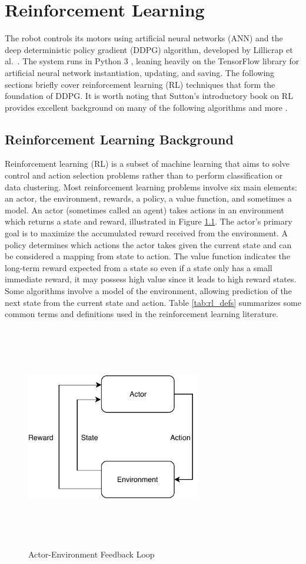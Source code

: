\chapter{Reinforcement Learning}
The robot controls its motors using artificial neural networks (ANN) and the deep deterministic policy gradient (DDPG) algorithm, developed by Lillicrap et al.\ \cite{lillicrap_2016}. The system runs in Python 3 \cite{python3}, leaning heavily on the TensorFlow library \cite{tensorflow} for artificial neural network instantiation, updating, and saving. The following sections briefly cover reinforcement learning (RL) techniques that form the foundation of DDPG. It is worth noting that Sutton's introductory book on RL provides excellent background on many of the following algorithms and more \cite{sutton_2017}.

\section{Reinforcement Learning Background}
Reinforcement learning (RL) is a subset of machine learning that aims to solve control and action selection problems rather than to perform classification or data clustering. Most reinforcement learning problems involve six main elements: an actor, the environment, rewards, a policy, a value function, and sometimes a model. An actor (sometimes called an agent) takes actions in an environment which returns a state and reward, illustrated in Figure \ref{fig:actor_env_loop}. The actor's primary goal is to maximize the accumulated reward received from the environment. A policy determines which actions the actor takes given the current state and can be considered a mapping from state to action. The value function indicates the long-term reward expected from a state so even if a state only has a small immediate reward, it may possess high value since it leads to high reward states. Some algorithms involve a model of the environment, allowing prediction of the next state from the current state and action. Table \ref{tab:rl_defs} summarizes some common terms and definitions used in the reinforcement learning literature.
\begin{figure}[H]   %
	\centering \includegraphics[width=3in, height=3.85in, keepaspectratio]{figures/actor_env_loop.pdf}
	\caption{Actor-Environment Feedback Loop}\label{fig:actor_env_loop}
\end{figure}
